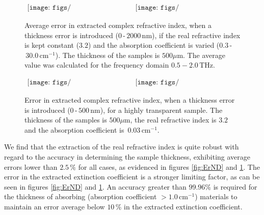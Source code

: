 \begin{figure}[H]
                \begin{center}$
								\begin{array}{cc}
                \texttt{[image: figs/n\_err\_d\_shift\_k\_change.png]}&
                \texttt{[image: figs/k\_err\_d\_shift\_k\_change.png]}
								\end{array}$
								\end{center}
	\caption[Error in extracted complex refractive index for constant real refractive index, varied absorption coefficient and multiple thickness errors]{Average error in extracted complex refractive index, when a thickness error is introduced ($0\,$-$\,2000\,$nm), if the real refractive index is kept constant ($3.2$) and the absorption coefficient is varied ($0.3\,$-$\,30.0\,\text{cm}^{-1}$). The thickness of the samples is $500\mu$m. The average value was calculated for the frequency domain $0.5-2.0\,$THz.}
	\label{fig:ErKD}
\end{figure}

\begin{figure}[H]
                \begin{center}$
								\begin{array}{cc}
                \texttt{[image: figs/n\_error(32003)-2.png]}&
                \texttt{[image: figs/k\_error(32003)-2.png]}
								\end{array}$
								\end{center}
	\caption[Error in extracted complex refractive index for transparent sample and multiple thickness errors]{Error in extracted complex refractive index, when a thickness error is introduced ($0\,$-$\,500\,$nm), for a highly transparent sample. The thickness of the samples is $500\mu$m, the real refractive index is $3.2$ and the absorption coefficient is $\,0.03\,\text{cm}^{-1}$.}
	\label{fig:ErTD}
\end{figure}

We find that the extraction of the real refractive index is quite robust with regard to the accuracy in determining the sample thickness, exhibiting average errors lower than $2.5\,\%$ for all cases, as evidenced in figures \ref{fig:ErND} and \ref{fig:ErKD}. The error in the extracted extinction coefficient is a stronger limiting factor, as can be seen in figures \ref{fig:ErND} and \ref{fig:ErKD}. An accuracy greater than $99.96\%$ is required for the thickness of absorbing (absorption coefficient $>1.0\,\text{cm}^{-1}$) materials to maintain an error average below $10\,\%$ in the extracted extinction coefficient. 

